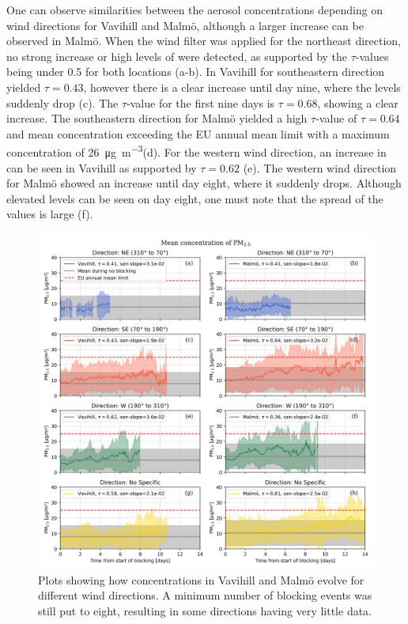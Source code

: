 One can observe similarities between the aerosol concentrations depending on wind directions for Vavihill and Malmö, although a larger increase can be observed in Malmö. When the wind filter was applied for the northeast direction, no strong increase or high levels of \PM were detected, as supported by the $\tau$-values being under 0.5 for both locations (a-b). In Vavihill for southeastern direction yielded $\tau=0.43$, however there is a clear increase until day nine, where the levels suddenly drop (c). The $\tau$-value for the first nine days is $\tau=0.68$, showing a clear increase. The southeastern direction for Malmö yielded a high $\tau$-value of $\tau=0.64$ and mean concentration exceeding the EU annual mean limit with a maximum concentration of \SI{26}{\micro\gram\per\meter\cubed}(d). For the western wind direction, an increase in \PM can be seen in Vavihill as supported by $\tau=0.62$ (e). The western wind direction for Malmö showed an increase until day eight, where it suddenly drops. Although elevated levels can be seen on day eight, one must note that the spread of the values is large (f). 

\begin{figure}[H]
    \centering
    \includegraphics[width=\textwidth]{Figures/Meanplot_dir.png}
    \caption{Plots showing how \PM concentrations in Vavihill and Malmö evolve for different wind directions. A minimum number of blocking events was still put to eight, resulting in some directions having very little data.}
    \label{fig:Meanplot_wind}
\end{figure}

